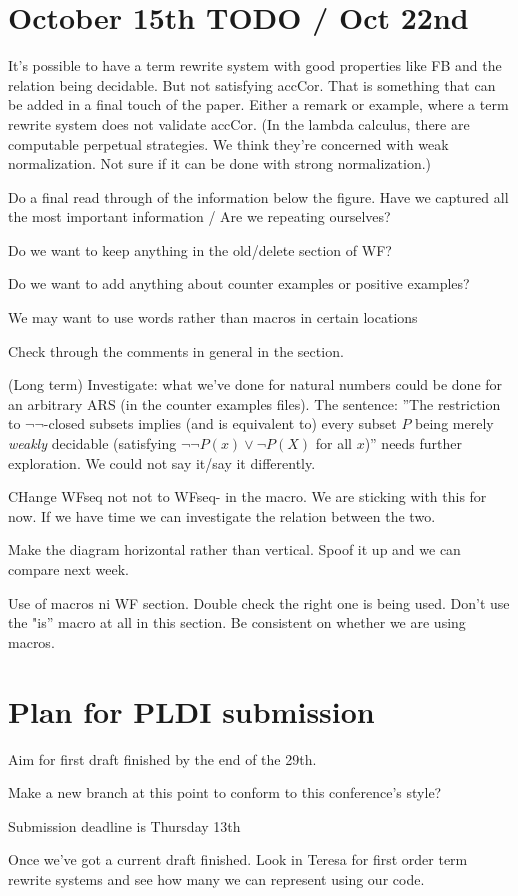 \documentclass{article}
\begin{document}
\section*{October 15th TODO / Oct 22nd}
\begin{todolist}     
  \item It's possible to have a term rewrite system with good properties like FB and the relation being decidable. But not satisfying accCor. That is something that can be added in a final touch of the paper. Either a remark or example, where a term rewrite system does not validate accCor. (In the lambda calculus, there are computable perpetual strategies. We think they're concerned with weak normalization. Not sure if it can be done with strong normalization.)
  \item Do a final read through of the information below the figure. Have we captured all the most important information / Are we repeating ourselves?
  \item Do we want to keep anything in the old/delete section of WF?
  \item Do we want to add anything about counter examples or positive examples? 
  \item We may want to use words rather than macros in certain locations
  \item Check through the comments in general in the section. 
  \item (Long term) Investigate: what we've done for natural numbers could be done for an arbitrary ARS (in the counter examples files). The sentence: ''The restriction to $\lnot\lnot$-closed subsets implies (and is equivalent to) 
every subset $P$ being merely \emph{weakly} decidable (satisfying $\lnot \lnot P(x) \lor \lnot P(X)$ 
for all $x$)'' needs further exploration. We could not say it/say it differently. 
\item CHange WFseq not not to WFseq- in the macro. We are sticking with this for now. If we have time we can investigate the relation between the two.
\item Make the diagram horizontal rather than vertical. Spoof it up and we can compare next week.
\item Use of macros ni WF section. Double check the right one is being used. Don't use the "is'' macro at all in this section. Be consistent on whether we are using macros. 
\item 
\end{todolist}


\section*{Plan for PLDI submission}
\begin{todolist}
  \item Aim for first draft finished by the end of the 29th.
  \item Make a new branch at this point to conform to this conference's style?
  \item Submission deadline is Thursday 13th 
  \item Once we've got a current draft finished. Look in Teresa for first order term rewrite systems and see how many we can represent using our code.
\end{todolist}
\end{document}
